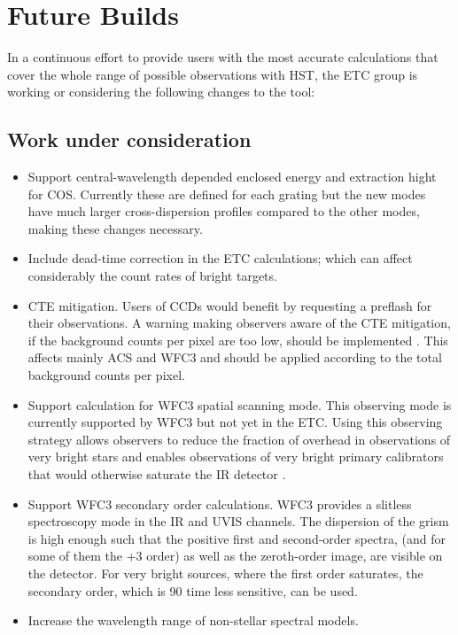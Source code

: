 \section{Future Builds}

In a continuous effort to provide users with the most accurate calculations that cover
the whole range of possible observations with HST, the ETC group is working or considering
the following changes to the tool:

\subsection{Work under consideration}

\begin{itemize}

\item Support central-wavelength depended enclosed energy and extraction hight
for COS. Currently these are  defined for each  grating but the new modes have  
much larger cross-dispersion profiles compared to the other modes, making 
these changes necessary.

\item Include dead-time correction in the ETC calculations; which can
affect considerably the count rates of bright targets.

\item CTE mitigation.  Users of CCDs would benefit by requesting a preflash for their observations. 
A warning making observers aware of the CTE mitigation, if the background counts per pixel are too low,
should be implemented . This
affects mainly ACS and WFC3 and should be applied according to the total background 
counts per pixel.

\item Support calculation for WFC3 spatial scanning mode. This observing mode is currently
supported by WFC3 but not yet in the ETC. Using this observing strategy allows observers to
reduce the fraction of overhead in observations of very bright stars and enables observations 
of very bright primary calibrators that would otherwise saturate the IR detector \citep{TheMcs2011}. 

\item Support WFC3 secondary order calculations. WFC3 provides a slitless spectroscopy mode 
in the IR and UVIS channels. The dispersion of the grism is high enough such that the positive 
first and second-order spectra, (and for some of them the +3 order) as well as the zeroth-order 
image, are visible on the detector. For very bright sources, where the first order saturates, 
the secondary order, which is 90 time less sensitive, can be used.

\item Increase the wavelength range of non-stellar spectral models.

\end{itemize}

